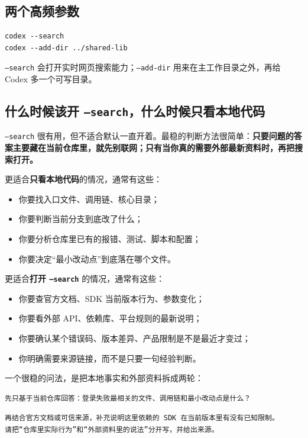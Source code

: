 \documentclass[UTF8,a4paper,12pt]{ctexart}
\begin{document}
\subsection{两个高频参数}

\begin{lstlisting}[style=cli]
codex --search
codex --add-dir ../shared-lib
\end{lstlisting}

\texttt{--search} 会打开实时网页搜索能力；\texttt{--add-dir} 用来在主工作目录之外，再给 Codex 多一个可写目录。

\subsection{什么时候该开 \texttt{--search}，什么时候只看本地代码}

\texttt{--search} 很有用，但不适合默认一直开着。最稳的判断方法很简单：\textbf{只要问题的答案主要藏在当前仓库里，就先别联网；只有当你真的需要外部最新资料时，再把搜索打开。}

更适合\textbf{只看本地代码}的情况，通常有这些：
\begin{itemize}
  \item 你要找入口文件、调用链、核心目录；
  \item 你要判断当前分支到底改了什么；
  \item 你要分析仓库里已有的报错、测试、脚本和配置；
  \item 你要决定“最小改动点”到底落在哪个文件。
\end{itemize}

更适合\textbf{打开 \texttt{--search}} 的情况，通常有这些：
\begin{itemize}
  \item 你要查官方文档、SDK 当前版本行为、参数变化；
  \item 你要看外部 API、依赖库、平台规则的最新说明；
  \item 你要确认某个错误码、版本差异、产品限制是不是最近才变过；
  \item 你明确需要来源链接，而不是只要一句经验判断。
\end{itemize}

一个很稳的问法，是把本地事实和外部资料拆成两轮：

\begin{lstlisting}[style=prompt]
先只基于当前仓库回答：登录失败最相关的文件、调用链和最小改动点是什么？
\end{lstlisting}

\begin{lstlisting}[style=prompt]
再结合官方文档或可信来源，补充说明这里依赖的 SDK 在当前版本里有没有已知限制。
请把“仓库里实际行为”和“外部资料里的说法”分开写，并给出来源。
\end{lstlisting}
\end{document}
